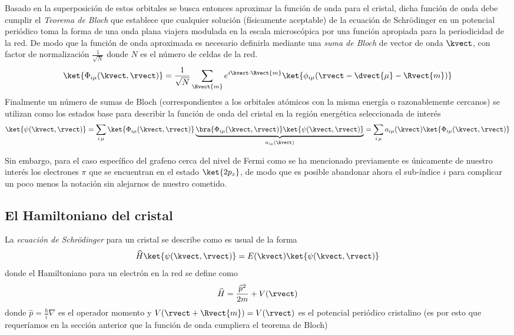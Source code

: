 Basado en la superposición de estos orbitales se busca entonces aproximar la función 
de onda para el cristal, dicha función de onda debe cumplir el 
\emph{Teorema de Bloch} que establece que cualquier solución (físicamente aceptable) 
de la ecuación de Schrödinger en un potencial periódico toma la forma de una onda 
plana viajera modulada en la escala microscópica por una función apropiada para la 
periodicidad de la red. De modo que la función de onda aproximada es necesario 
definirla mediante una \emph{suma de Bloch} de vector de onda $ \kvect $, con factor 
de normalización $ \frac{1}{\sqrt N} $ donde $ N $ es el número de celdas de la red.
\begin{equation}\label{eq:blochsum}
\ket{\Phi_{i\mu}(\kvect, \rvect)} = \frac{1}{\sqrt N}\sum_{\Rvect{m}} e^{i\kvect\cdot\Rvect{m}} \ket{\phi_{i\mu}(\rvect - \dvect{\mu} - \Rvect{m})}
\end{equation}
Finalmente un número de sumas de Bloch (correspondientes a los orbitales atómicos 
con la misma energía o razonablemente cercanos) se utilizan como los estados base 
para describir la función de onda del cristal en la región energética seleccionada 
de interés
\begin{equation}\label{eq:crystalwave}
\ket{\psi(\kvect, \rvect)} = \sum_{i\,\mu} \ket{\Phi_{i\mu}(\kvect, \rvect)}\underbrace{\bra{\Phi_{i\mu}(\kvect, \rvect)}\ket{\psi(\kvect, \rvect)}}_{a_{i\mu}(\kvect)} = \sum_{i\,\mu} a_{i\mu}(\kvect)\ket{\Phi_{i\mu}(\kvect, \rvect)}
\end{equation}

Sin embargo, para el caso específico del grafeno cerca del nivel de Fermi como se ha 
mencionado previamente  es únicamente de nuestro interés los electrones $ \pi $ que 
se encuentran en el estado $ \ket{2p_z} $, de modo que es posible abandonar ahora el 
sub-índice $ i $ para complicar un poco menos la notación sin alejarnos de nuestro 
cometido.

\subsection{El Hamiltoniano del cristal}

La \emph{ecuación de Schrödinger} para un cristal se describe como es usual de la forma
\begin{equation}\label{eq:schroedinger}
\widehat{H}\ket{\psi(\kvect, \rvect)} = E(\kvect)\ket{\psi(\kvect, \rvect)}
\end{equation}
donde el Hamiltoniano para un electrón en la red se define como
\begin{equation}\label{eq:crystallhamiltonian}
\widehat{H} = \frac{\widehat{p}^2}{2m} + V(\rvect)
\end{equation}
donde $ \widehat{p} = \frac{\hbar}{i}\nabla $ es el operador momento y 
$ V(\rvect + \Rvect{m}) = V(\rvect) $ es el potencial periódico cristalino (es por 
esto que requeríamos en la sección anterior que la función de onda cumpliera el 
teorema de Bloch)


